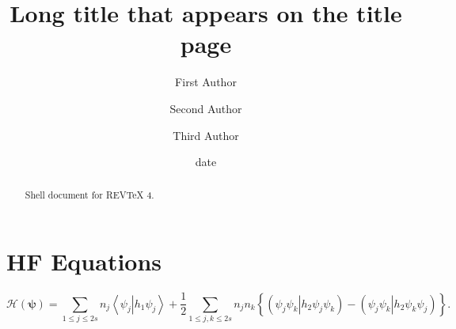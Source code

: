 \documentclass[aps,preprint]{revtex4}%
\begin{document}
\title[Short title for running header]{Long title that appears on the title page}
\author{First Author}
\author{Second Author}
\author{Third Author}

\begin{abstract}
Shell document for REV\TeX{} 4.

\end{abstract}
\date[Date text]{date}




\maketitle
\tableofcontents


\section{HF Equations}%

\begin{equation}
\mathcal{H}\left(  \mathbf{\psi}\right)  =\sum_{1\leq j\leq2s}n_{j}%
\left\langle \psi_{j}\right\vert h_{1}\left.  \psi_{j}\right\rangle +\frac
{1}{2}\sum_{1\leq j,k\leq2s}n_{j}n_{k}\left\{  \left(  \left.  \psi_{j}%
\psi_{k}\right\vert h_{2}\psi_{j}\psi_{k}\right)  -\left(  \left.  \psi
_{j}\psi_{k}\right\vert h_{2}\psi_{k}\psi_{j}\right)  \right\}  .
\end{equation}
\end{document}
